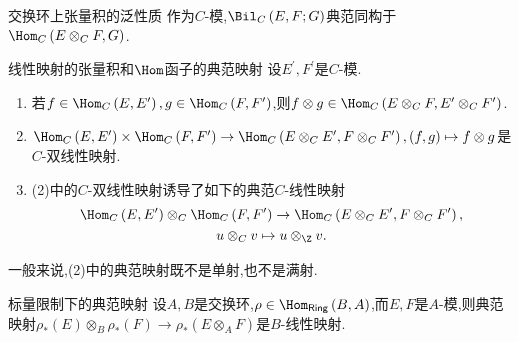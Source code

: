 \begin{corollary}{交换环上张量积的泛性质}{}
	作为$C$-模,$\Bil_{C}\left(E,F;G\right)$典范同构于$\Hom_{C}\left(E\otimes_{C}F,G\right)$.
\end{corollary}

\begin{proposition}{线性映射的张量积和$\Hom$函子的典范映射}{}
	设$E^{\prime},F^{\prime}$是$C$-模.
	\begin{enumerate}
		\item 若$f\in\Hom_{C}\left(E,E^{\prime}\right),g\in\Hom_{C}\left(F,F^{\prime}\right)$,则$f\otimes g\in\Hom_{C}\left(E\otimes_{C}F,E^{\prime}\otimes_{C}F^{\prime}\right)$.
		\item $\Hom_{C}\left(E,E^{\prime}\right)\times\Hom_{C}\left(F,F^{\prime}\right)\to\Hom_{C}\left(E\otimes_{C}E^{\prime},F\otimes_{C}F^{\prime}\right),\left(f,g\right)\mapsto f\otimes g$是$C$-双线性映射.
		\item (2)中的$C$-双线性映射诱导了如下的典范$C$-线性映射
		\begin{gather*}
			\Hom_{C}\left(E,E^{\prime}\right)\otimes_{C}\Hom_{C}\left(F,F^{\prime}\right)\to\Hom_{C}\left(E\otimes_{C}E^{\prime},F\otimes_{C}F^{\prime}\right),\\
			u\otimes_{C}v\mapsto u\otimes_{\Z}v.
		\end{gather*}
	\end{enumerate}
\end{proposition}

\begin{remark}{}{}
	一般来说,(2)中的典范映射既不是单射,也不是满射.
\end{remark}

\begin{remark}{标量限制下的典范映射}{}
	设$A,B$是交换环,$\rho\in\Hom_{\mathsf{Ring}}\left(B,A\right)$,而$E,F$是$A$-模,则典范映射$\rho_{\ast}\left(E\right)\otimes_{B}\rho_{\ast}\left(F\right)\to\rho_{\ast}\left(E\otimes_{A}F\right)$是$B$-线性映射.
\end{remark}

